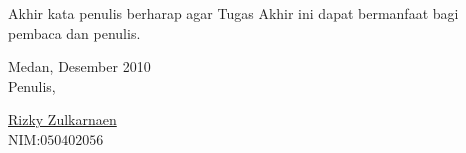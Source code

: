 Akhir kata penulis berharap agar Tugas Akhir ini dapat bermanfaat bagi pembaca dan penulis.

\vspace*{2cm} 
\begin{flushright} 
Medan,\hspace{0.2cm} Desember 2010 \hspace{1cm} \\ %
Penulis,\hspace{2.2cm}
\par 
\vspace*{1cm} 

\underline{Rizky Zulkarnaen}\\%
NIM:$050402056$ \hspace{0.6cm} \par
\end{flushright} 